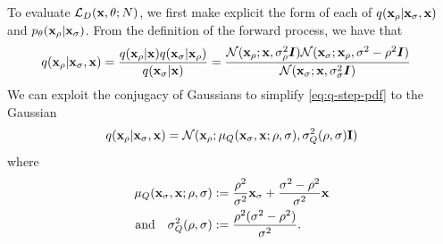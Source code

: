 To evaluate $\mathcal{L}_D({\mathbf{x}}, \theta; N)$, we first make explicit the form of each of $q({\mathbf{x}}_{\rho} | {\mathbf{x}}_{\sigma}, {\mathbf{x}})$ and $p_\theta({\mathbf{x}}_{\rho} | {\mathbf{x}}_{\sigma})$. From the definition of the forward process, we have that
\begin{align} \label{eq:q-step-pdf}
    q({\mathbf{x}}_{\rho} | {\mathbf{x}}_{\sigma}, {\mathbf{x}}) &= \frac{q({\mathbf{x}}_{\rho} | {\mathbf{x}}) q({\mathbf{x}}_{\sigma} | {\mathbf{x}}_{\rho})}{q({\mathbf{x}}_{\sigma}|{\mathbf{x}})} = \frac{{\mathcal{N}}({\mathbf{x}}_{\rho}; {\mathbf{x}}, \sigma_{\rho}^2 {\bm{I}}) {\mathcal{N}}({\mathbf{x}}_{\sigma}; {\mathbf{x}}_{\rho}, \sigma^2-\rho^2 {\bm{I}}) }{{\mathcal{N}}({\mathbf{x}}_{\sigma}; {\mathbf{x}}, \sigma_{\sigma}^2 {\bm{I}})}
\end{align}
We can exploit the conjugacy of Gaussians to simplify \cref{eq:q-step-pdf} to the Gaussian
\begin{align}
    q({\mathbf{x}}_\rho|{\mathbf{x}}_\sigma,{\mathbf{x}}) = {\mathcal{N}}( {\mathbf{x}}_\rho; \mathbf{\mu}_Q({\mathbf{x}}_\sigma, {\mathbf{x}}; \rho, \sigma), \sigma_Q^2(\rho, \sigma) \mathbf{I})
\end{align}
where
\begin{align} \label{eq:mu-q}
    \mathbf{\mu}_Q({\mathbf{x}}_\sigma, {\mathbf{x}}; \rho, \sigma) &:= \frac{\rho^2}{\sigma^2} {\mathbf{x}}_\sigma + \frac{\sigma^2-\rho^2}{\sigma^2} {\mathbf{x}} \\
    \label{eq:sigma-q}
    \text{and}\quad 
    \sigma_Q^2(\rho, \sigma) &:= \frac{\rho^2 (\sigma^2-\rho^2)}{\sigma^2}.
\end{align}

